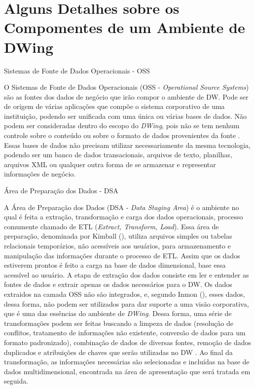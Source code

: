 \chapter{Alguns Detalhes sobre os Compomentes de um Ambiente de DWing}
\label{Att:dw}


\begin{description}
	\item[Sistemas de Fonte de Dados Operacionais - OSS]
\end{description}
%

O Sistemas de Fonte de Dados Operacionais (OSS - \emph{Operational Source Systems}) são as fontes dos dados de negócio que irão compor o ambiente de DW.
%
Pode ser de origem de várias aplicações que compõe o sistema corporativo de uma instituição, podendo ser unificada com uma única ou várias bases de dados.
%
Não podem ser consideradas dentro do escopo do \emph{DWing}, pois  não se tem nenhum controle sobre o conteúdo ou sobre o formato de dados provenientes da fonte \cite{kimball2002}.
%
Essas bases de dados não precisam utilizar necessariamente da mesma tecnologia, podendo ser um banco de dados transacionais, arquivos de texto, planilhas, arquivos XML ou qualquer outra forma de se armazenar e representar informações de negócio.

\begin{description}
\item[Área de Preparação dos Dados - DSA]
\end{description}
%

A Área de Preparação dos Dados (DSA - \emph{Data Staging Area}) é o ambiente no qual é feita a extração, transformação e carga dos dados operacionais, processo comumente chamado de ETL (\emph{Extract, Transform, Load}).
%
Essa área de preparação, denominada por Kimball (\citeyear{kimball2002}), utiliza arquivos simples ou tabelas relacionais temporários, não acessíveis aos usuários, para armazenamento e manipulação das informações durante o processo de ETL.
%
Assim que os dados estiverem prontos é feito a carga na base de dados dimensional, base essa acessível ao usuário.
%
A etapa de extração dos dados consiste em ler e entender as fontes de dados e extrair apenas os dados necessários para o DW.
%
Os dados extraidos na camada OSS não são integrados, e, segundo Inmon (\citeyear{inmon2002}), esses dados, dessa forma, não podem ser utilizados para dar suporte a uma visão corporativa, que é uma das essências do ambiente de \emph{DWing}.
%
Dessa forma, uma série de transformações podem ser feitas buscando a limpeza de dados (resolução de conflitos, tratamento de informações não existente, conversão de dados para um formato padronizado), combinação de dados de diversas fontes, remoção de dados duplicados e atribuições de chaves que serão utilizadas no DW \cite{kimball2002}.
%
Ao final da transformação, as informações necessárias são selecionadas e incluídas na base de dados multidimensional, encontrada na área de apresentação que será tratada em seguida.

